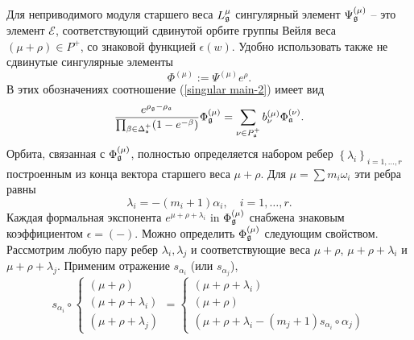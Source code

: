 Для неприводимого модуля старшего веса $L_{\mathfrak{g}}^{\mu }$ сингулярный элемент $\Psi _{\mathfrak{g}}^{\left( \mu \right) }$ -- это элемент $\mathcal{E}$, соответствующий сдвинутой орбите группы Вейля веса $\left( \mu +\rho\right) \in P^{+}$, со знаковой функцией $\epsilon \left( w\right) $. Удобно использовать также не сдвинутые сингулярные элементы
\begin{equation}
\Phi ^{\left( \mu \right) }:=\Psi ^{\left( \mu \right) }e^{\rho }.
\label{definition Phi}
\end{equation}
В этих обозначениях соотношение (\ref{singular main-2}) имеет вид
\begin{equation}
\frac{e^{\rho _{\gf}-\rho _{\af}}}{\prod_{\beta \in \Delta _{\frak{%
s}}^{+}}(1-e^{-\beta })}\Phi _{\gf}^{\left( \mu \right) }=\sum_{\nu \in
P_{\af}^{+}}b_{\nu }^{(\mu )}\Phi _{\af}^{\left( \nu \right) }.
\label{singular main-3}
\end{equation}
Орбита, связанная с  $\Phi _{\mathfrak{g}}^{\left( \mu \right) }$, полностью определяется набором ребер $\left\{ \lambda _{i}\right\} _{i=1,\dots ,r}$ построенным из конца вектора старшего веса $\mu +\rho $. Для $\mu=\sum m_{i}\omega _{i}$ эти ребра равны
\begin{equation}
\lambda _{i}=-\left( m_{i}+1\right) \alpha _{i},\quad i=1,\dots ,r.
\label{edge}
\end{equation}
Каждая формальная экспонента $e^{\mu +\rho +\lambda _{i}}$ in $\Phi _{\mathfrak{g}}^{\left( \mu \right) }$ снабжена знаковым коэффициентом  $\epsilon =(-)$. Можно определить $\Phi_{\mathfrak{g}}^{\left( \mu \right) }$ следующим свойством. Рассмотрим любую пару ребер $\lambda _{i},\lambda _{j}$ и соответствующие веса $\mu +\rho $, $\mu +\rho +\lambda _{i}$ и $\mu +\rho +\lambda _{j}$. 
Применим отражение $s_{\alpha _{i}}$ (или $s_{\alpha _{j}}$),
\begin{equation}
s_{\alpha _{i}}\circ \left\{
\begin{array}{l}
\left( \mu +\rho \right)  \\
\left( \mu +\rho +\lambda _{i}\right)  \\
\left( \mu +\rho +\lambda _{j}\right)
\end{array}
\right. =\left\{
\begin{array}{l}
\left( \mu +\rho +\lambda _{i}\right)  \\
\left( \mu +\rho \right)  \\
\left( \mu +\rho +\lambda _{i}-(m_{j}+1)s_{\alpha _{i}}\circ \alpha
_{j}\right)
\end{array}
\right.   \label{reflected triple}
\end{equation}


